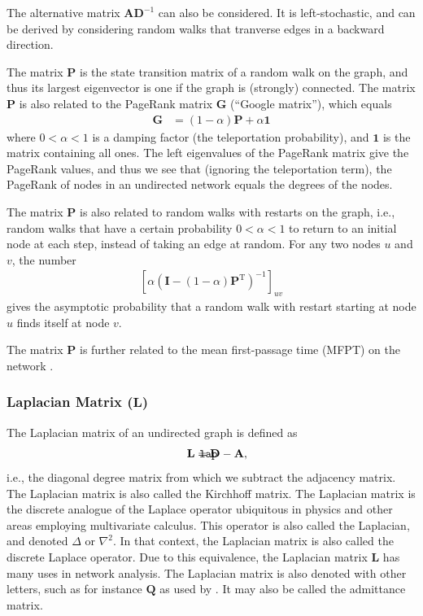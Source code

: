 \documentclass{article}
\def\mathnote#1{%
  \tag*{\rlap{\hspace\marginparsep\smash{\parbox[t]{\marginparwidth}{#1}}}}
}
\begin{document}
The alternative matrix $\mathbf A \mathbf D^{-1}$ can also be
considered.  It is left-stochastic, and
can be derived by considering random walks that tranverse edges in a
backward direction. 

The matrix $\mathbf P$ is the state transition matrix of a random walk
on the graph, and thus its largest eigenvector is one if the graph is
(strongly) connected.  
The matrix $\mathbf P$ is also related to the PageRank matrix $\mathbf
G$ (``Google matrix''), which
equals 
\begin{align}
  \mathbf G &= (1-\alpha) \mathbf P + \alpha\mathbf 1
\end{align}
where $0 < \alpha < 1$ is a damping factor (the teleportation
probability), and $\mathbf 1$ is the matrix containing all ones.  The
left 
eigenvalues of the PageRank matrix give the PageRank values, and thus
we see that (ignoring the teleportation term), the PageRank of nodes in
an undirected network equals the degrees of the nodes. 

The matrix $\mathbf P$ is also related to random walks with restarts on
the graph, i.e., random walks that have a certain probability $0 <
\alpha < 1$
to return to an initial node at each step, instead of taking an edge at
random.  For any two nodes $u$ and $v$, the number
\begin{align}
  \left[\alpha  (\mathbf I - (1-\alpha) \mathbf P^{\mathrm T})^{-1}\right]_{uv}
\end{align}
gives the asymptotic probability that a random walk with restart starting at node $u$
finds itself at node $v$.  

The matrix $\mathbf P$ is further related to the mean first-passage time
(MFPT) on the network \citep{b880}.

\subsubsection{Laplacian Matrix ($\mathbf L$)}
\label{sec:matrix.L}
The Laplacian matrix of an undirected graph is defined as
\begin{align}
  \mathnote{\texttt{lap}}
  \mathbf L &= \mathbf D - \mathbf A,
\end{align}
i.e., the diagonal degree matrix from which we subtract the adjacency
matrix.  The Laplacian matrix is also called the Kirchhoff matrix. 
The Laplacian matrix is the discrete analogue of the Laplace operator
ubiquitous in physics and other areas employing multivariate calculus.
This operator is also called the Laplacian, and denoted $\Delta$ or
$\nabla^2$.  In that context, the Laplacian matrix is also called the
discrete Laplace operator. 
Due to this equivalence, the Laplacian matrix $\mathbf L$
has many uses in network analysis. 
The Laplacian matrix is also denoted with other letters, such as for
instance $\mathbf Q$ as used by \cite{b902}.  It may also be called the
admittance matrix.  
\end{document}
